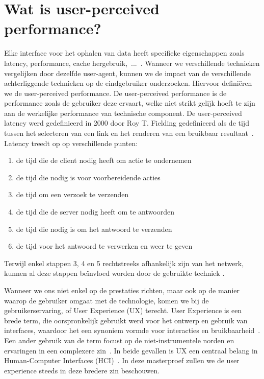 \section{Wat is user-perceived performance?}
\label{sec:what_is_user_perceived_performance}
Elke interface voor het ophalen van data heeft specifieke eigenschappen zoals latency, performance, cache hergebruik,~...~\citep{verborgh16}. Wanneer we verschillende technieken vergelijken door dezelfde user-agent, kunnen we de impact van de verschillende achterliggende technieken op de eindgebruiker onderzoeken. Hiervoor definiëren we de user-perceived performance. De user-perceived performance is de performance zoals de gebruiker deze ervaart, welke niet strikt gelijk hoeft te zijn aan de werkelijke performance van technische component. De user-perceived latency werd gedefinieerd in 2000 door Roy T. Fielding gedefinieerd als de tijd tussen het selecteren van een link en het renderen van een bruikbaar resultaat~\citep{fielding99}. Latency treedt op op verschillende punten: 
\begin{enumerate}
	\item de tijd die de client nodig heeft om actie te ondernemen 
	\item de tijd die nodig is voor voorbereidende acties
	\item de tijd om een verzoek te verzenden
	\item de tijd die de server nodig heeft om te antwoorden
	\item de tijd die nodig is om het antwoord te verzenden
	\item de tijd voor het antwoord te verwerken en weer te geven
\end{enumerate}
Terwijl enkel stappen 3, 4 en 5 rechtstreeks afhankelijk zijn van het netwerk, kunnen al deze stappen beïnvloed worden door de gebruikte techniek \citep{fielding99}.

Wanneer we ons niet enkel op de prestaties richten, maar ook op de manier waarop de gebruiker omgaat met de technologie, komen we bij de gebruikerservaring, of User Experience (UX) terecht. User Experience is een brede term, die oorspronkelijk gebruikt werd voor het ontwerp en gebruik van interfaces, waardoor het een synoniem vormde voor interacties en bruikbaarheid~\citep{avila11}. Een ander gebruik van de term focust op de niet-instrumentele norden en ervaringen in een complexere zin~\citep{avila11}. In beide gevallen is UX een centraal belang in Human-Computer Interfaces (HCI)~\citep{NíChonchúir2008}. In deze masterproef zullen we de  user experience steeds in deze bredere zin beschouwen. 

